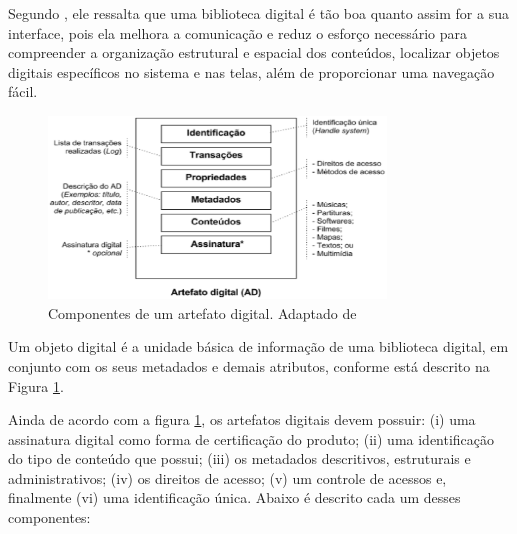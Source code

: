 Segundo \cite{arms2000digital}, ele ressalta que uma biblioteca digital é tão boa quanto assim for a sua interface, pois ela melhora a comunicação e reduz o esforço necessário para compreender a organização estrutural e espacial dos conteúdos, localizar objetos digitais específicos no sistema e nas telas, além de proporcionar uma navegação fácil. 

\graphicspath{{figuras/}}
\begin{figure}[H]
\centering
\includegraphics[width=0.8\textwidth]{artefato_digital}
\caption[Componentes de um artefato digital]{Componentes de um artefato digital. Adaptado de \cite{kuramoto2007bibliotecas}}
\label{fig:compartefdigital}
\end{figure}

Um objeto digital é a unidade básica de informação de uma biblioteca digital, em conjunto com os seus metadados e demais atributos, conforme está descrito na Figura \ref{fig:compartefdigital}.

Ainda de acordo com a figura \ref{fig:compartefdigital}, os artefatos digitais devem possuir: (i) uma assinatura digital como forma de certificação do produto; (ii) uma identificação do tipo de conteúdo que possui; (iii) os metadados descritivos, estruturais e administrativos; (iv) os direitos de acesso; (v) um controle de acessos e, finalmente (vi) uma identificação única. Abaixo é descrito cada um desses componentes: 

